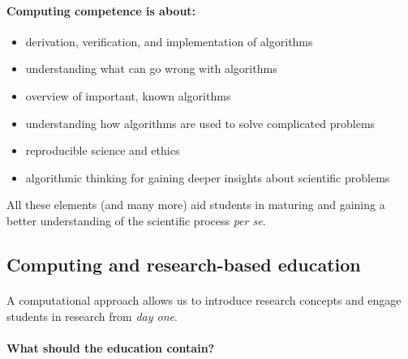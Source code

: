 \documentclass[%
twoside,                 %
final,                   %
10pt]{article}
\begin{document}
\paragraph{Computing competence is about:}

\begin{itemize}
\item derivation, verification, and implementation of algorithms

\item understanding what can go wrong with algorithms

\item overview of important, known algorithms

\item understanding how algorithms are used to solve complicated problems

\item reproducible science and ethics

\item algorithmic thinking for gaining deeper insights about scientific problems
\end{itemize}

\noindent
All these elements (and many more) aid students in maturing and gaining a better understanding of the scientific process \emph{per se}.







\subsection{Computing and research-based education}


\paragraph{}
A computational approach allows us to introduce research concepts and engage students in research from \emph{day one}.





\paragraph{What should the education contain?}
\end{document}
